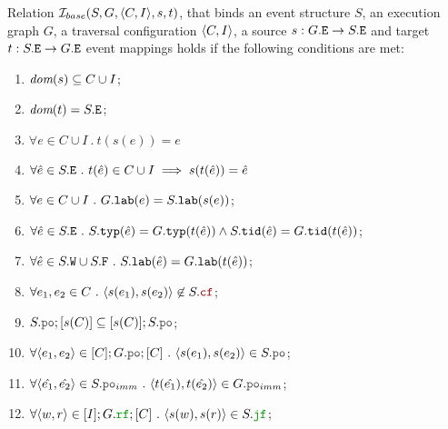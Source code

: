 \documentclass[12pt]{article}
\begin{document}
\begin{definition}
  Relation $\mathcal{I}_{base}(S, G, \langle C, I \rangle, s, t)$, that binds an 
  event structure $S$, an \imm execution graph $G$,
  a traversal configuration $\langle C, I \rangle$,
  a source $s : G.{\mathtt{E}} \rightarrow S.{\mathtt{E}}$ and target $t : S.{\mathtt{E}} \rightarrow G.{\mathtt{E}}$ event mappings
  holds if the following conditions are met:
  \begin{enumerate}[label=\textbf{S.\arabic*}]

  \item \label{item:sim-dom-s}
    $\textit{dom}{({s})} \subseteq C \cup I$;

  \item \label{item:sim-dom-t}
    $\textit{dom}{({t})} = S.{\mathtt{E}}$;

  \item \label{item:sim-ts-id}
    $\forall{e \in C \cup I} ~.~ t(s(e)) = e$

  \item \label{item:sim-st-id}
    $\forall{\hat{e} \in S.{\mathtt{E}}} ~.~ t(\hat{e}) \in C \cup I \implies s(t(\hat{e})) = \hat{e}$
   
  \item \label{item:sim-lab}
    $\forall{e \in C \cup I} ~.~ G.{\mathtt{lab}}(e) = S.{\mathtt{lab}}(s(e))$;

  \item \label{item:sim-typ-tid}
      $\forall{\hat{e} \in S.{\mathtt{E}}} ~.~
      S.{\mathtt{typ}}(\hat{e}) = G.{\mathtt{typ}}(t(\hat{e})) \wedge
      S.{\mathtt{tid}}(\hat{e}) = G.{\mathtt{tid}}(t(\hat{e}))
      $;

  \item \label{item:sim-lab-wf}
    $\forall{\hat{e} \in S.{\mathtt{W}}\cup S.{\mathtt{F}}} ~.~ S.{\mathtt{lab}}(\hat{e}) = G.{\mathtt{lab}}(t(\hat{e}))$;

  \item \label{item:sim-cf}
    $\forall{e_1, e_2 \in C} ~.~ \tup{s(e_1), s(e_2)} \not\in S.\lCF$;

  \item \label{item:sim-po-prfx} 
    $S.\lPO;[s(\lC)] \subseteq [s(C)];S.\lPO$;

  \item \label{item:sim-po}
    $\forall{\tup{e_1, e_2} \in [C];G.\lPO;[C]} ~.~ \tup{s(e_1), s(e_2)} \in S.\lPO$;

  \item \label{item:sim-po-imm}
    $\forall{\tup{\hat{e_1}, \hat{e_2}} \in S.\lPO_{imm}} ~.~
     \tup{t(\hat{e_1}), t(\hat{e_2})} \in G.\lPO_{imm}$;

  \item \label{item:sim-rf} 
    $\forall{\tup{w, r} \in [I];G.\lRF;[C]} ~.~ \tup{s(w), s(r)} \in S.\lJF$;

  \end{enumerate}
\end{definition}
\end{document}
